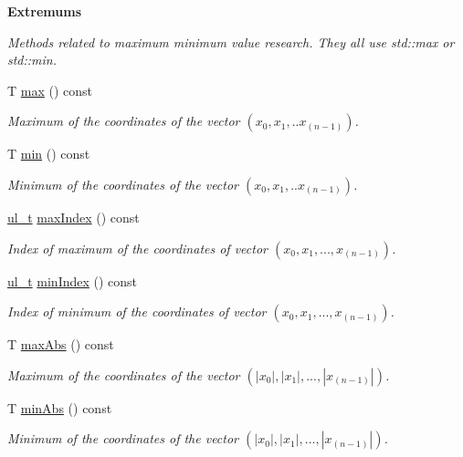 \begin{Indent}\textbf{ Extremums}\par
{\em Methods related to maximum minimum value research. They all use {\ttfamily std\+::max} or {\ttfamily std\+::min}. }\begin{DoxyCompactItemize}
\item 
T \mbox{\hyperlink{class_n_vector_afc7553743872ccb71e902a154eb60dc2}{max}} () const
\begin{DoxyCompactList}\small\item\em Maximum of the coordinates of the vector $ (x_0, x_1, .. x_{(n-1)}) $. \end{DoxyCompactList}\item 
T \mbox{\hyperlink{class_n_vector_ab81d84a1fce6b8647e5fd4e34ec90db7}{min}} () const
\begin{DoxyCompactList}\small\item\em Minimum of the coordinates of the vector $ (x_0, x_1, .. x_{(n-1)}) $. \end{DoxyCompactList}\item 
\mbox{\hyperlink{typedef_8h_a1b140a2034db3f5dfe18a987745df43a}{ul\+\_\+t}} \mbox{\hyperlink{class_n_vector_ab0521dd8dc4af0e9167770f85084d2d6}{max\+Index}} () const
\begin{DoxyCompactList}\small\item\em Index of maximum of the coordinates of vector $ (x_0, x_1, ..., x_{(n-1)}) $. \end{DoxyCompactList}\item 
\mbox{\hyperlink{typedef_8h_a1b140a2034db3f5dfe18a987745df43a}{ul\+\_\+t}} \mbox{\hyperlink{class_n_vector_aea9d0e6c8b20628b5e09f8194484a8d3}{min\+Index}} () const
\begin{DoxyCompactList}\small\item\em Index of minimum of the coordinates of vector $ (x_0, x_1, ..., x_{(n-1)}) $. \end{DoxyCompactList}\item 
T \mbox{\hyperlink{class_n_vector_a2d77a1ff10574ae5ca33fb3c11a087e2}{max\+Abs}} () const
\begin{DoxyCompactList}\small\item\em Maximum of the coordinates of the vector $ (|x_0|, |x_1|, ..., |x_{(n-1)}|) $. \end{DoxyCompactList}\item 
T \mbox{\hyperlink{class_n_vector_a857878b360cede51eb87924cd46d5a54}{min\+Abs}} () const
\begin{DoxyCompactList}\small\item\em Minimum of the coordinates of the vector $ (|x_0|, |x_1|, ..., |x_{(n-1)}|) $. \end{DoxyCompactList}\item 

\end{DoxyCompactItemize}
\end{Indent}
